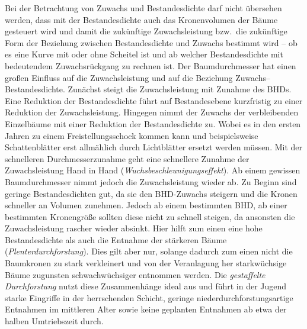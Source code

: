 \documentclass[twocolumn, paper=a4, fontsize=10pt]{scrartcl}
\begin{document}
Bei der Betrachtung von Zuwachs und Bestandesdichte darf nicht übersehen werden, dass mit der Bestandesdichte auch das Kronenvolumen der Bäume gesteuert wird und damit die zukünftige Zuwachsleistung bzw.\ die zukünftige Form der Beziehung zwischen Bestandesdichte und Zuwachs bestimmt wird – ob es eine Kurve mit oder ohne Scheitel ist und ab welcher Bestandesdichte mit bedeutendem Zuwachsrückgang zu rechnen ist. Der Baumdurchmesser hat einen großen Einfluss auf die Zuwachsleistung und auf die Beziehung Zuwachs--Bestandesdichte. Zunächst steigt die Zuwachsleistung mit Zunahme des BHDs. Eine Reduktion der Bestandesdichte führt auf Bestandesebene kurzfristig zu einer Reduktion der Zuwachsleistung. Hingegen nimmt der Zuwachs der verbleibenden Einzelbäume mit einer Reduktion der Bestandesdichte zu. Wobei es in den ersten Jahren zu einem Freistellungsschock kommen kann und beispielsweise Schattenblätter erst allmählich durch Lichtblätter ersetzt werden müssen. Mit der schnelleren Durchmesserzunahme geht eine schnellere Zunahme der Zuwachsleistung Hand in Hand (\emph{Wuchsbeschleunigungseffekt}). Ab einem gewissen Baumdurchmesser nimmt jedoch die Zuwachsleistung wieder ab. Zu Beginn sind geringe Bestandesdichten gut, da sie den BHD-Zuwachs steigern und die Kronen schneller an Volumen zunehmen. Jedoch ab einem bestimmten BHD, ab einer bestimmten Kronengröße sollten diese nicht zu schnell steigen, da ansonsten die Zuwachsleistung rascher wieder absinkt. Hier hilft zum einen eine hohe Bestandesdichte als auch die Entnahme der stärkeren Bäume (\emph{Plenterdurchforstung}). Dies gilt aber nur, solange dadurch zum einen nicht die Baumkronen zu stark verkleinert und von der Veranlagung her starkwüchsige Bäume zugunsten schwachwüchsiger entnommen werden. Die \emph{gestaffelte Durchforstung} nutzt diese Zusammenhänge ideal aus und führt in der Jugend starke Eingriffe in der herrschenden Schicht, geringe niederdurchforstungsartige Entnahmen im mittleren Alter sowie keine geplanten Entnahmen ab etwa der halben Umtriebszeit durch.
\end{document}
